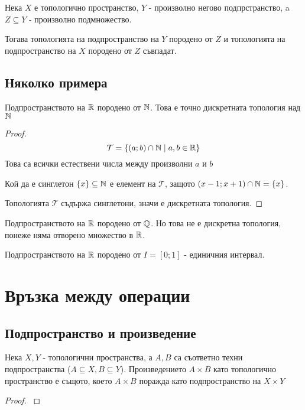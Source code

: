 \begin{proposition}
    Нека $X$ е топологично пространство, $Y$ - произволно негово подпрстранство, a $Z \subseteq Y$ - произволно подмножество.

    Тогава топологията на подпространство на $Y$ породено от $Z$ и топологията на подпространство на $X$ породено от $Z$ съвпадат.
\end{proposition}

\subsection{Няколко примера}
\begin{example}
    Подпространството на ${\mathbb{R}}$ породено от ${\mathbb{N}}$. Това е точно дискретната топология над ${\mathbb{N}}$
\end{example}
\begin{proof}
    \begin{equation}
        \mathcal T = \left\{(a; b) \cap {\mathbb{N}} \mid a, b \in {\mathbb{R}}\right\}
    \end{equation}
    Това са всички естествени числа между произволни $a$ и $b$

    Кой да е синглетон $\{x\} \subseteq {\mathbb{N}}$ е елемент на $\mathcal T$, защото $(x-1;x+1) \cap {\mathbb{N}} = \{x\}$.

    Топологията $\mathcal T$ съдържа синглетони, значи е дискретната топология.
\end{proof}
\begin{example}
    Подпространството на ${\mathbb{R}}$ породено от ${\mathbb{Q}}$. Но това не е дискретна топология, понеже няма отворено множество в ${\mathbb{R}}$. 
\end{example}
\begin{example}
    Подпространството на ${\mathbb{R}}$ породено от $I = [0; 1]$ - единичния интервал.
\end{example}

\section{Връзка между операции}
\subsection{Подпространство и произведение}
\begin{theorem}
    Нека $X, Y$ - топологични пространства, а $A, B$ са съответно техни подпространства ($A \subseteq X, B \subseteq Y$). Произведението $A \times B$ като топологично пространство е същото, което $A \times B$ поражда като подпространство на $X \times Y$
\end{theorem}
\begin{proof}
    \cite[p.~87]{munkrestopology}
\end{proof}